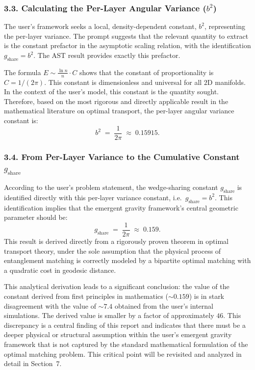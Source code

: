 \documentclass[11pt]{article}
\begin{document}
\subsubsection*{3.3. Calculating the Per-Layer Angular Variance ($b^2$)}
The user’s framework seeks a local, density-dependent constant, $b^2$, representing the per-layer variance. The prompt suggests that the relevant quantity to extract is the constant prefactor in the asymptotic scaling relation, with the identification $g_{\mathrm{share}} = b^2$. The AST result provides exactly this prefactor.

The formula $E \sim \frac{\ln n}{n} \cdot C$ shows that the constant of proportionality is $C = 1/(2\pi)$. This constant is dimensionless and universal for all $2$D manifolds. In the context of the user’s model, this constant is the quantity sought. Therefore, based on the most rigorous and directly applicable result in the mathematical literature on optimal transport, the per-layer angular variance constant is:
\[
b^2 \;=\; \frac{1}{2\pi} \;\approx\; 0.15915.
\]

\subsubsection*{3.4. From Per-Layer Variance to the Cumulative Constant $g_{\mathrm{share}}$}
According to the user’s problem statement, the wedge-sharing constant $g_{\mathrm{share}}$ is identified directly with this per-layer variance constant, i.e.\ $g_{\mathrm{share}} = b^2$. This identification implies that the emergent gravity framework’s central geometric parameter should be:
\[
g_{\mathrm{share}} \;=\; \frac{1}{2\pi} \;\approx\; 0.159.
\]
This result is derived directly from a rigorously proven theorem in optimal transport theory, under the sole assumption that the physical process of entanglement matching is correctly modeled by a bipartite optimal matching with a quadratic cost in geodesic distance.

This analytical derivation leads to a significant conclusion: the value of the constant derived from first principles in mathematics ($\sim 0.159$) is in stark disagreement with the value of $\sim 7.4$ obtained from the user’s internal simulations. The derived value is smaller by a factor of approximately $46$. This discrepancy is a central finding of this report and indicates that there must be a deeper physical or structural assumption within the user’s emergent gravity framework that is not captured by the standard mathematical formulation of the optimal matching problem. This critical point will be revisited and analyzed in detail in Section~7.
\end{document}
